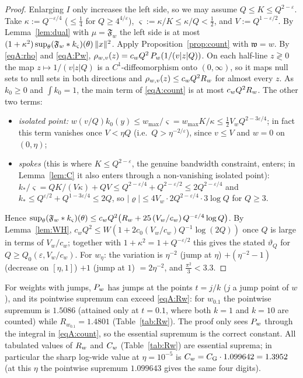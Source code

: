 \begin{proof}
Enlarging $I$ only increases the left side, so we may assume $Q\le K\le Q^{2-\varepsilon}$. Take
$\kappa:=Q^{-\varepsilon/4}$ ($\le\frac14$ for $Q\ge4^{4/\varepsilon}$), $\varsigma:=\kappa/K\le\kappa/Q<\frac12$, and
$V:=Q^{1-\varepsilon/2}$. By Lemma~\ref{lem:dual} with $\mu=\mathfrak F_w$ the left side is at most
$(1+\kappa^2)\sup_{\theta}(\mathfrak F_w*k_{\varsigma})(\theta)\,\|x\|^2$. Apply Proposition~\ref{prop:count} with $\mathfrak w=w$.
By \eqref{eqA:rho} and \eqref{eqA:Pw}, $\rho_{w,v}(z)=c_wQ^2\,P_w(1/(v|z|Q))$. On each half-line $z\gtrless0$ the map
$z\mapsto1/(v|z|Q)$ is a $C^1$-diffeomorphism onto $(0,\infty)$, so it maps null sets to null sets in both directions and
$\rho_{w,v}(z)\le c_wQ^2R_w$ for almost every $z$. As $k_0\ge0$ and $\int k_0=1$, the main term of \eqref{eqA:count}
is at most $c_wQ^2R_w$. The other two terms:
\begin{itemize}
\item \emph{isolated point:} $w(v/Q)k_0(y)\le w_{\max}/\varsigma=w_{\max}K/\kappa\le\frac12V_wQ^{2-3\varepsilon/4}$; in fact this term
 vanishes once $V<\eta Q$ (i.e.\ $Q>\eta^{-2/\varepsilon}$), since $v\le V$ and $w=0$ on $(0,\eta)$;
\item \emph{spokes} (this is where $K\le Q^{2-\varepsilon}$, the genuine bandwidth constraint, enters; in Lemma~\ref{lem:C} it also
 enters through a non-vanishing isolated point): $k_*/\varsigma=QK/(V\kappa)+QV\le Q^{2-\varepsilon/4}+Q^{2-\varepsilon/2}\le2Q^{2-\varepsilon/4}$ and
 $k_*\le Q^{\varepsilon/2}+Q^{1-3\varepsilon/4}\le2Q$, so $|\varrho|\le 4V_w\cdot2Q^{2-\varepsilon/4}\cdot3\log Q$ for $Q\ge3$.
\end{itemize}
Hence $\sup_\theta(\mathfrak F_w*k_{\varsigma})(\theta)\le c_wQ^2\big(R_w+25\,(V_w/c_w)\,Q^{-\varepsilon/4}\log Q\big)$. By
Lemma~\ref{lem:WH}, $c_wQ^2\le W(1+2c_0(V_w/c_w)Q^{-1}\log(2Q))$ once $Q$ is large in terms of $V_w/c_w$; together with
$1+\kappa^2=1+Q^{-\varepsilon/2}$ this gives the stated $\vartheta_Q$ for $Q\ge Q_0(\varepsilon,V_w/c_w)$. For $w_\eta$:
the variation is $\eta^{-2}$ (jump at $\eta$) $+(\eta^{-2}-1)$ (decrease on $[\eta,1]$) $+1$ (jump at $1$) $=2\eta^{-2}$, and
$\frac{\pi^2}{3}<3.3$.
\end{proof}

\begin{remark}\label{rem:essup}
For weights with jumps, $P_w$ has jumps at the points $t=j/k$ ($j$ a jump point of $w$), and its pointwise supremum can
exceed \eqref{eqA:Rw}: for $w_{0.1}$ the pointwise supremum is $1.5086$ (attained only at $t=0.1$, where both $k=1$ and
$k=10$ are counted) while $R_{w_{0.1}}=1.4801$ (Table~\ref{tab:Rw}). The proof only sees $P_w$ through the integral in \eqref{eqA:count}, so the essential
supremum is the correct constant. All tabulated values of $R_w$ and $C_w$ (Table~\ref{tab:Rw}) are essential suprema;
in particular the sharp log-wide value at $\eta=10^{-5}$ is $C_w=C_{\mathrm G}\cdot1.099642=1.3952$ (at this $\eta$ the pointwise supremum
$1.099643$ gives the same four digits).
\end{remark}

